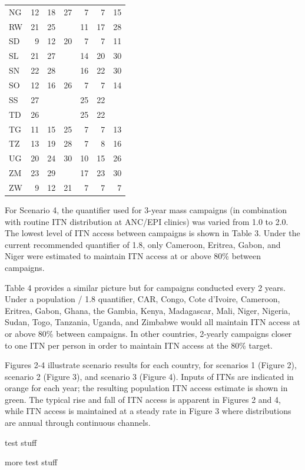 \documentclass[review,
3p]{elsarticle} %
\begin{document}
\begin{longtable}{lrrrrrr}
NG & 12 & 18 & 27 & 7 & 7 & 15 \\ 
RW & 21 & 25 &  & 11 & 17 & 28 \\ 
SD & 9 & 12 & 20 & 7 & 7 & 11 \\ 
SL & 21 & 27 &  & 14 & 20 & 30 \\ 
SN & 22 & 28 &  & 16 & 22 & 30 \\ 
SO & 12 & 16 & 26 & 7 & 7 & 14 \\ 
SS & 27 &  &  & 25 & 22 &  \\ 
TD & 26 &  &  & 25 & 22 &  \\ 
TG & 11 & 15 & 25 & 7 & 7 & 13 \\ 
TZ & 13 & 19 & 28 & 7 & 8 & 16 \\ 
UG & 20 & 24 & 30 & 10 & 15 & 26 \\ 
ZM & 23 & 29 &  & 17 & 23 & 30 \\ 
ZW & 9 & 12 & 21 & 7 & 7 & 7 \\ 
\bottomrule
\end{longtable}

For Scenario 4, the quantifier used for 3-year mass campaigns (in
combination with routine ITN distribution at ANC/EPI clinics) was varied
from 1.0 to 2.0. The lowest level of ITN access between campaigns is
shown in Table 3. Under the current recommended quantifier of 1.8, only
Cameroon, Eritrea, Gabon, and Niger were estimated to maintain ITN
access at or above 80\% between campaigns.

Table 4 provides a similar picture but for campaigns conducted every 2
years. Under a population / 1.8 quantifier, CAR, Congo, Cote d'Ivoire,
Cameroon, Eritrea, Gabon, Ghana, the Gambia, Kenya, Madagascar, Mali,
Niger, Nigeria, Sudan, Togo, Tanzania, Uganda, and Zimbabwe would all
maintain ITN access at or above 80\% between campaigns. In other
countries, 2-yearly campaigns closer to one ITN per person in order to
maintain ITN access at the 80\% target.

Figures 2-4 illustrate scenario results for each country, for scenarios
1 (Figure 2), scenario 2 (Figure 3), and scenario 3 (Figure 4). Inputs
of ITNs are indicated in orange for each year; the resulting population
ITN access estimate is shown in green. The typical rise and fall of ITN
access is apparent in Figures 2 and 4, while ITN access is maintained at
a steady rate in Figure 3 where distributions are annual through
continuous channels.

test stuff

more test stuff
\end{document}
